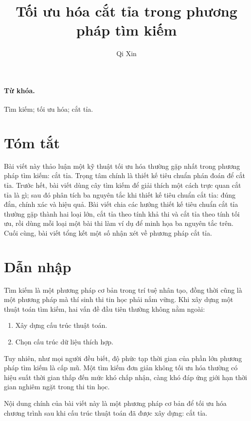\documentclass[11pt]{article}
\title{Tối ưu hóa cắt tỉa trong phương pháp tìm kiếm}
\author{Qi Xin}
\date{}
\begin{document}
\maketitle


\paragraph{Từ khóa.}
Tìm kiếm; tối ưu hóa; cắt tỉa.

\section*{Tóm tắt}

Bài viết này thảo luận một kỹ thuật tối ưu hóa thường gặp nhất trong phương
pháp tìm kiếm: cắt tỉa. Trọng tâm chính là thiết kế tiêu chuẩn phán đoán để
cắt tỉa. Trước hết, bài viết dùng cây tìm kiếm để giải thích một cách trực
quan cắt tỉa là gì; sau đó phân tích ba nguyên tắc khi thiết kế tiêu chuẩn
cắt tỉa: đúng đắn, chính xác và hiệu quả. Bài viết chia các hướng thiết kế
tiêu chuẩn cắt tỉa thường gặp thành hai loại lớn, cắt tỉa theo tính khả thi
và cắt tỉa theo tính tối ưu, rồi dùng mỗi loại một bài thi làm ví dụ để minh
họa ba nguyên tắc trên. Cuối cùng, bài viết tổng kết một số nhận xét về
phương pháp cắt tỉa.

\section{Dẫn nhập}

Tìm kiếm là một phương pháp cơ bản trong trí tuệ nhân tạo, đồng thời cũng là
một phương pháp mà thí sinh thi tin học phải nắm vững. Khi xây dựng một thuật
toán tìm kiếm, hai vấn đề đầu tiên thường không nằm ngoài:
\begin{enumerate}
  \item Xây dựng cấu trúc thuật toán.
  \item Chọn cấu trúc dữ liệu thích hợp.
\end{enumerate}

Tuy nhiên, như mọi người đều biết, độ phức tạp thời gian của phần lớn phương
pháp tìm kiếm là cấp mũ. Một tìm kiếm đơn giản không tối ưu hóa thường có
hiệu suất thời gian thấp đến mức khó chấp nhận, càng khó đáp ứng giới hạn
thời gian nghiêm ngặt trong thi tin học.

Nội dung chính của bài viết này là một phương pháp cơ bản để tối ưu hóa
chương trình sau khi cấu trúc thuật toán đã được xây dựng: cắt tỉa.
\end{document}
